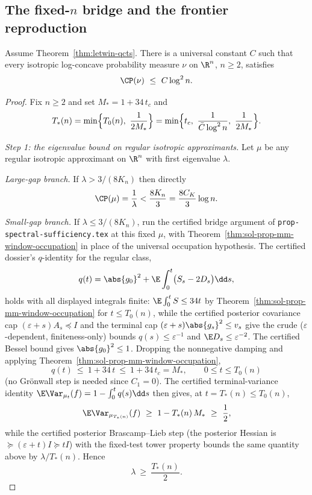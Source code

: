 \documentclass[../main.tex]{subfiles}
\begin{document}
\subsection*{The fixed-$n$ bridge and the frontier reproduction}

\begin{theorem}
\label{thm:sol-mwo-frontier}
Assume Theorem~\ref{thm:letwin-qcts}.  There is a universal constant $C$ such that
every isotropic log-concave probability measure $\nu$ on $\R^n$, $n\ge2$, satisfies
\[
  \CP(\nu)\ \le\ C\log^2n .
\]
\end{theorem}

\begin{proof}
Fix $n\ge2$ and set $M_*=1+34\,t_c$ and
\[
  T_*(n)=\min\Bigl\{T_0(n),\ \frac1{2M_*}\Bigr\}
        =\min\Bigl\{t_c,\ \frac1{\bar C\log^2n},\ \frac1{2M_*}\Bigr\}.
\]

\emph{Step 1: the eigenvalue bound on regular isotropic approximants.}
Let $\mu$ be any regular isotropic approximant on $\R^n$ with first eigenvalue
$\lambda$.

\emph{Large-gap branch.}  If $\lambda>3/(8K_n)$ then directly
\[
  \CP(\mu)=\frac1\lambda<\frac{8K_n}3=\frac{8C_K}3\log n .
\]

\emph{Small-gap branch.}  If $\lambda\le3/(8K_n)$, run the certified bridge argument
of \texttt{prop-spectral-\allowbreak sufficiency.tex} at this fixed $\mu$, with
Theorem~\ref{thm:sol-prop-mm-window-occupation} in place of the universal occupation
hypothesis.  The certified dossier's $q$-identity for the regular class,
\[
  q(t)=\abs{g_0}^2+\E\int_0^t\bigl(S_s-2D_s\bigr)\dd s,
\]
holds with all displayed integrals finite: $\E\int_0^tS\le34t$ by
Theorem~\ref{thm:sol-prop-mm-window-occupation} for $t\le T_0(n)$, while the certified
posterior covariance cap $(\varepsilon+s)A_s\preceq I$ and the terminal cap
$(\varepsilon+s)\abs{g_s}^2\le v_s$ give the crude ($\varepsilon$-dependent, finiteness-only)
bounds $q(s)\le\varepsilon^{-1}$ and
$\E D_s\le\varepsilon^{-2}$.  The certified Bessel bound gives $\abs{g_0}^2\le1$.
Dropping the nonnegative damping and applying
Theorem~\ref{thm:sol-prop-mm-window-occupation},
\[
  q(t)\ \le\ 1+34\,t\ \le\ 1+34\,t_c=M_*,
  \qquad 0\le t\le T_0(n)
\]
(no Gr\"onwall step is needed since $C_1=0$).  The certified terminal-variance
identity $\E\Var_{\mu_t}(f)=1-\int_0^tq(s)\dd s$ then gives, at $t=T_*(n)\le T_0(n)$,
\[
  \E\Var_{\mu_{T_*(n)}}(f)\ \ge\ 1-T_*(n)\,M_*\ \ge\ \frac12,
\]
while the certified posterior Brascamp--Lieb step (the posterior Hessian is
$\succeq(\varepsilon+t)I\succeq tI$) with the fixed-test tower property bounds the same
quantity above by $\lambda/T_*(n)$.  Hence
\[
  \lambda\ \ge\ \frac{T_*(n)}2 .
\]


\end{proof}
\end{document}
